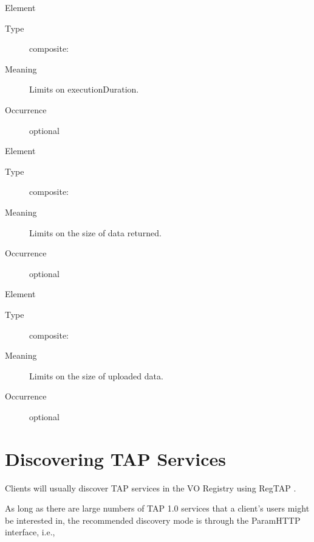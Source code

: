 \documentclass{ivoa}
\begin{document}
\begin{generated}
\begin{bigdescription}
\begin{description}
\end{description}
\item[Element \xmlel{executionDuration}]
\begin{description}
\item[Type] composite: 
\item[Meaning] 
              Limits on executionDuration.
              
\item[Occurrence] optional

\end{description}
\item[Element \xmlel{outputLimit}]
\begin{description}
\item[Type] composite: 
\item[Meaning] 
              Limits on the size of data returned.
              
\item[Occurrence] optional

\end{description}
\item[Element \xmlel{uploadLimit}]
\begin{description}
\item[Type] composite: 
\item[Meaning] 
              Limits on the size of uploaded data.
              
\item[Occurrence] optional

\end{description}


\end{bigdescription}\endgroup

\endgroup
\end{generated}


\section{Discovering TAP Services}

Clients will usually discover TAP services in the VO Registry using
RegTAP \citep{2019ivoa.spec.1011D}.

As long as there are large numbers of TAP 1.0 services that a client's
users might be interested in, the recommended discovery mode is through
the ParamHTTP interface, i.e.,
\end{document}
